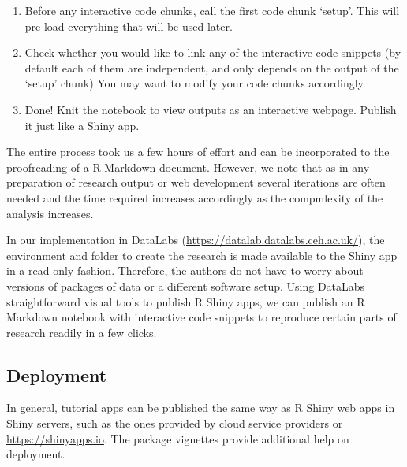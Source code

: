 

\begin{enumerate}
\def\labelenumi{\arabic{enumi}.}
\setcounter{enumi}{3}
\tightlist
\item
  Before any interactive code chunks, call the first code chunk `setup'.
  This will pre-load everything that will be used later.
\item
  Check whether you would like to link any of the interactive code
  snippets (by default each of them are independent, and only depends on
  the output of the `setup' chunk) You may want to modify your code
  chunks accordingly.
\item
  Done! Knit the notebook to view outputs as an interactive webpage.
  Publish it just like a Shiny app.
\end{enumerate}

The entire process took us a few hours of effort and can be incorporated
to the proofreading of a R Markdown document. However, we note that as
in any preparation of research output or web development several
iterations are often needed and the time required increases accordingly
as the compmlexity of the analysis increases.

In our implementation in DataLabs
(\url{https://datalab.datalabs.ceh.ac.uk/}), the environment and folder
to create the research is made available to the Shiny app in a read-only
fashion. Therefore, the authors do not have to worry about versions of
packages of data or a different software setup. Using DataLabs
straightforward visual tools to publish R Shiny apps, we can publish an
R Markdown notebook with interactive code snippets to reproduce certain
parts of research readily in a few clicks.

\hypertarget{deployment}{%
\subsection{Deployment}\label{deployment}}

In general,  tutorial apps can be published the same way
as R Shiny web apps in Shiny servers, such as the ones provided by cloud
service providers or \url{https://shinyapps.io}. The 
package vignettes provide additional help on deployment.

